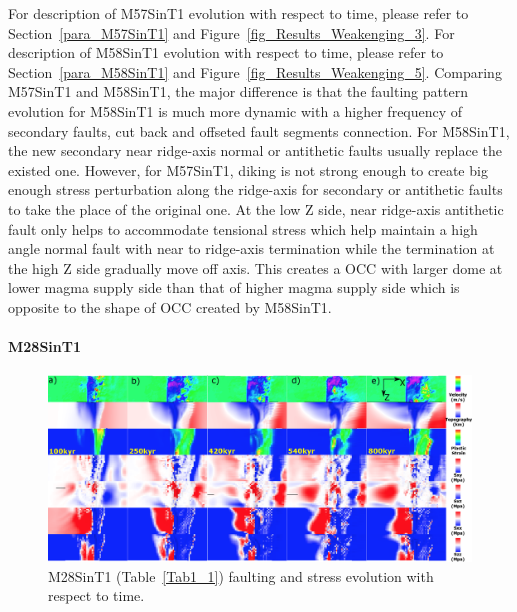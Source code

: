 For description of M57SinT1 evolution with respect to time, please refer to Section~\hyperref[para_M57SinT1]{\ref{para_M57SinT1}} and Figure~\hyperref[fig_Results_Weakenging_3]{\ref{fig_Results_Weakenging_3}}. For description of M58SinT1 evolution with respect to time, please refer to  Section~\hyperref[para_M58SinT1]{\ref{para_M58SinT1}} and Figure~\hyperref[fig_Results_Weakenging_5]{\ref{fig_Results_Weakenging_5}}. Comparing M57SinT1 and M58SinT1, the major difference is that the faulting pattern evolution for M58SinT1 is much more dynamic with a higher frequency of secondary faults, cut back and offseted fault segments connection. For M58SinT1, the new secondary near ridge-axis normal or antithetic faults usually replace the existed one. However, for M57SinT1, diking is not strong enough to create big enough stress perturbation along the ridge-axis for secondary or antithetic faults to take the place of the original one. At the low Z side, near ridge-axis antithetic fault only helps to accommodate tensional stress which help maintain a high angle normal fault with near to ridge-axis termination while the termination at the high Z side gradually move off axis. This creates a OCC with larger dome at lower magma supply side than that of higher magma supply side which is opposite to the shape of OCC created by M58SinT1. 

\paragraph{M28SinT1}\label{para_M28SinT1}

\begin{figure}[h]
 \centering
  \includegraphics[width=1.0\textwidth]{./Figures/fig_Results_MRange_1_M28SinT1_time_evolution.eps}
 \caption{M28SinT1 (Table~\hyperref[Tab1_1]{\ref{Tab1_1}}) faulting and stress evolution with respect to time.}
\label{fig_Results_MRange_1}
\end{figure}

